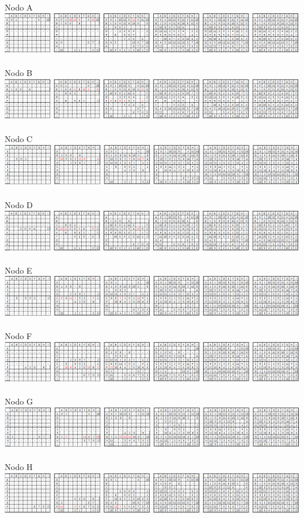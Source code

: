 \documentclass[paper=a4, fontsize=11pt]{scrartcl}
\numberwithin{equation}{section}		%
\numberwithin{figure}{section}			%
\numberwithin{table}{section}				%
\begin{document}
Nodo A
\includegraphics[width=1\textwidth]{2a.png}\\\\
Nodo B
\includegraphics[width=1\textwidth]{2b.png}\\\\
Nodo C
\includegraphics[width=1\textwidth]{2c.png}\\\\
Nodo D
\includegraphics[width=1\textwidth]{2d.png}\\\\
Nodo E
\includegraphics[width=1\textwidth]{2e.png}\\\\
Nodo F
\includegraphics[width=1\textwidth]{2f.png}\\\\
Nodo G
\includegraphics[width=1\textwidth]{2g.png}\\\\
Nodo H
\includegraphics[width=1\textwidth]{2h.png}\\\\
\end{document}
